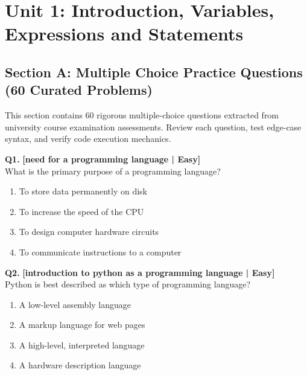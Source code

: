 \chapter{Unit 1: Introduction, Variables, Expressions and Statements}

\section{Section A: Multiple Choice Practice Questions (60 Curated Problems)}

\noindent This section contains 60 rigorous multiple-choice questions extracted from university course examination assessments. Review each question, test edge-case syntax, and verify code execution mechanics.
\vspace{3mm}

\noindent\textbf{Q1.} \hfill {\small\color{LPUOrange}\textbf{[need for a programming language | Easy]}}\\[2pt]
What is the primary purpose of a programming language?

\begin{enumerate}[label=(\alph*),topsep=2pt,itemsep=1pt,partopsep=0pt,parsep=0pt]
    \item \relax To store data permanently on disk
    \item \relax To increase the speed of the CPU
    \item \relax To design computer hardware circuits
    \item \relax To communicate instructions to a computer
\end{enumerate}
\vspace{2mm}

\noindent\textbf{Q2.} \hfill {\small\color{LPUOrange}\textbf{[introduction to python as a programming language | Easy]}}\\[2pt]
Python is best described as which type of programming language?

\begin{enumerate}[label=(\alph*),topsep=2pt,itemsep=1pt,partopsep=0pt,parsep=0pt]
    \item \relax A low-level assembly language
    \item \relax A markup language for web pages
    \item \relax A high-level, interpreted language
    \item \relax A hardware description language
\end{enumerate}
\vspace{2mm}

